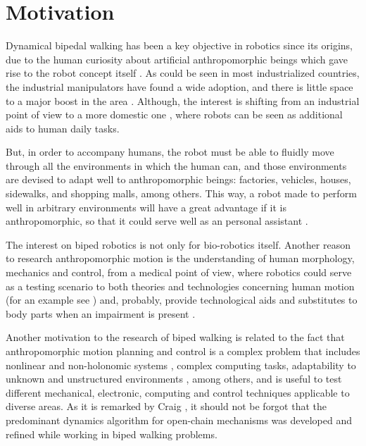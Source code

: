 \section{Motivation}
Dynamical bipedal walking has been a key objective in robotics since
its origins, due to the human curiosity about artificial
anthropomorphic beings which gave rise to the robot concept itself
\cite{Capek3R.U.R.}. As could be seen in most industrialized
countries, the industrial manipulators have found a wide adoption, and
there is little space to a major boost in the area
\cite{Yonemoto85TECHNOLOGY}. Although, the interest is shifting from
an industrial point of view to a more domestic one
\cite{Asami94Robots}, where robots can be seen as additional aids to
human daily tasks.

But, in order to accompany humans, the robot must be able to fluidly
move through all the environments in which the human can, and those
environments are devised to adapt well to anthropomorphic beings:
factories, vehicles, houses, sidewalks, and shopping malls, among
others. This way, a robot made to perform well in arbitrary
environments will have a great advantage if it is anthropomorphic, so
that it could serve well as an personal assistant
\cite{Dario01Humanoids}.


The interest on biped robotics is not only for bio-robotics
itself. Another reason to research anthropomorphic motion is the
understanding of human morphology, mechanics and control, from a
medical point of view, where robotics could serve as a testing
scenario to both theories and technologies concerning human motion
(for an example see \cite{Woo06Biomechanics}) and, probably, provide
technological aids and substitutes to body parts when an impairment is
present \cite{Hermini01Proposal}.


Another motivation to the research of biped walking is related to the
fact that anthropomorphic motion planning and control is a complex
problem that includes nonlinear and non-holonomic systems
\cite{Basdogan96Nonlinear}, complex computing tasks, adaptability to
unknown and unstructured environments \cite{Cheng00Dynamic}, among
others, and is useful to test different mechanical, electronic,
computing and control techniques applicable to diverse areas. As it is
remarked by Craig \cite{Craig89Introduction}, it should not be forgot
that the predominant dynamics algorithm for open-chain mechanisms was
developed \cite{Stepanenko6Dynamics} and refined \cite{Orin9Kinematic}
while working in biped walking problems.


